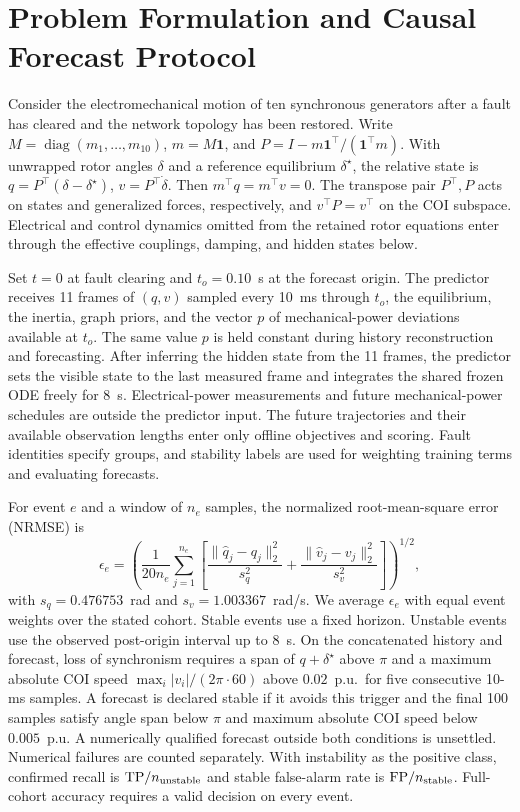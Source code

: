 \documentclass[journal]{IEEEtran}
\DeclareMathOperator{\diag}{diag}
\begin{document}
\section{Problem Formulation and Causal Forecast Protocol}
\label{sec:problem}
Consider the electromechanical motion of ten synchronous generators after a
fault has cleared and the network topology has been restored. Write
\(M=\diag(m_1,\ldots,m_{10})\), \(m=M\mathbf{1}\), and
\(P=I-m\mathbf{1}^\top/(\mathbf{1}^\top m)\). With unwrapped rotor angles
\(\delta\) and a reference equilibrium \(\delta^\star\), the relative state is
\(q=P^\top(\delta-\delta^\star)\), \(v=P^\top\dot\delta\). Then
\(m^\top q=m^\top v=0\). The transpose pair \(P^\top,P\) acts on states and
generalized forces, respectively, and \(v^\top P=v^\top\) on the COI subspace.
Electrical and control dynamics omitted from the retained rotor equations
enter through the effective couplings, damping, and hidden states below.

Set \(t=0\) at fault clearing and \(t_o=0.10\)~s at the forecast origin. The
predictor receives 11 frames of \((q,v)\) sampled every 10~ms through
\(t_o\), the equilibrium, the inertia, graph priors, and the vector \(p\) of
mechanical-power deviations available at \(t_o\). The same value \(p\) is held
constant during history reconstruction and forecasting. After inferring the
hidden state from the 11 frames, the predictor sets the visible state to the
last measured frame and integrates the shared frozen ODE freely for 8~s.
Electrical-power measurements and future mechanical-power schedules are
outside the predictor input. The future trajectories and their available
observation lengths enter only offline objectives and scoring. Fault
identities specify groups, and stability labels are used for weighting
training terms and evaluating forecasts.

For event \(e\) and a window of \(n_e\) samples, the normalized
root-mean-square error (NRMSE) is
\begin{equation}
 \epsilon_e=
 \left(\frac{1}{20 n_e}\sum_{j=1}^{n_e}
 \left[\frac{\|\hat q_j-q_j\|_2^2}{s_q^2}
     +\frac{\|\hat v_j-v_j\|_2^2}{s_v^2}\right]\right)^{1/2},
 \label{eq:nrmse}
\end{equation}
with \(s_q=0.476753\)~rad and \(s_v=1.003367\)~rad/s.
We average \(\epsilon_e\) with equal event weights over the stated cohort.
Stable events use a fixed horizon. Unstable events use the observed
post-origin interval up to 8~s.
On the concatenated history and forecast, loss of synchronism requires a span
of \(q+\delta^\star\) above \(\pi\) and a maximum absolute COI speed
\(\max_i |v_i|/(2\pi\cdot60)\) above \(0.02\)~p.u.\ for five consecutive
10-ms samples.
A forecast is declared stable if it avoids this trigger and the final 100
samples satisfy angle span below \(\pi\) and maximum absolute COI speed below
\(0.005\)~p.u. A numerically qualified forecast outside both conditions is
unsettled. Numerical failures are counted separately. With instability as
the positive class, confirmed recall is \(\mathrm{TP}/n_{\rm unstable}\)
and stable false-alarm rate is \(\mathrm{FP}/n_{\rm stable}\). Full-cohort
accuracy requires a valid decision on every event.
\end{document}
